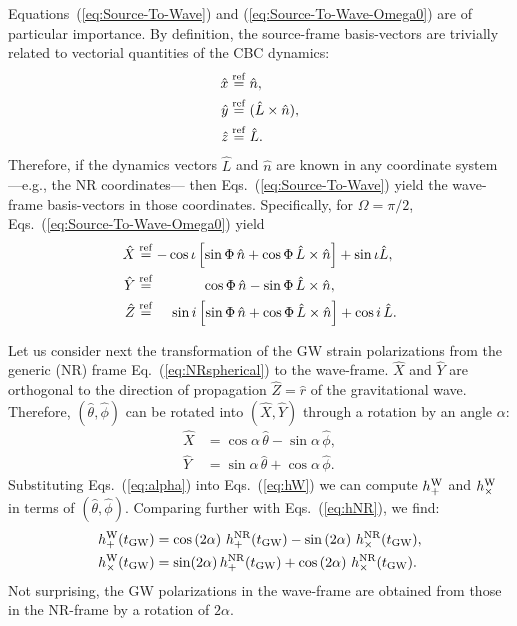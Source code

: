 \documentclass[aps,prd,amssymb,amsmath,amsfonts,superscriptaddress,
floatfix ,preprintnumbers,altaffilletter]{revtex4}
\newcommand{\ErNR}{{\hat r}}
\newcommand{\EtNR}{{\hat\theta}}
\newcommand{\EpNR}{{\hat\phi}}
\newcommand{\hpNR}{h_+^{\rm NR}}
\newcommand{\hcNR}{h_{\times}^{\rm NR}}
\newcommand{\nNR}{\hat{n}}
\newcommand{\lNR}{\hat L}
\newcommand{\tGW}{t_{\rm GW}}
\newcommand{\ExS}{{{\hat x}}}
\newcommand{\EyS}{{{\hat y}}}
\newcommand{\EzS}{{{\hat z}}}
\newcommand{\ExW}{\hat X}
\newcommand{\EyW}{\hat Y}
\newcommand{\EzW}{\hat Z}
\newcommand{\hpW}{h_+^{\rm W}}
\newcommand{\hcW}{h_\times^{\rm W}}
\newcommand{\phiRef}{\Phi} %
\newcommand{\equalref}{\overset{\rm ref}{=}}
\begin{document}
Equations~(\ref{eq:Source-To-Wave}) and
(\ref{eq:Source-To-Wave-Omega0}) are of particular importance.  By
definition, the source-frame basis-vectors are trivially related to
vectorial quantities of the CBC dynamics:
\begin{subequations}
  \begin{align}
    \ExS&\equalref \nNR,\\
    \EyS&\equalref (\lNR\times\nNR),\\
    \EzS&\equalref \lNR.
  \end{align}
\end{subequations}
Therefore, if the dynamics vectors $\lNR$ and $\nNR$ are known in any
coordinate system ---e.g., the NR coordinates--- then
Eqs.~(\ref{eq:Source-To-Wave}) yield the wave-frame basis-vectors in those
coordinates.  Specifically, for $\Omega=\pi/2$,
Eqs.~(\ref{eq:Source-To-Wave-Omega0}) yield
\begin{subequations}
  \begin{align}
    \ExW &\equalref-\cos\iota\left[\sin\phiRef\,\nNR +\cos\phiRef\,\lNR\times\nNR\right]+\sin\iota\lNR,\\
    \EyW &\equalref \qquad\quad\;\,\cos\phiRef\,\nNR -\sin\phiRef\,\lNR\times\nNR,\\
\label{eq:Z}
    \EzW&\equalref\;\;\;\; \sin i\left[\sin\phiRef\,\nNR +\cos\phiRef\,\lNR\times\nNR\right]
    +\cos i\,\lNR.
  \end{align}
\end{subequations}

Let us consider next the transformation of the GW strain polarizations
from the generic (NR) frame Eq.~(\ref{eq:NRspherical}) to the
wave-frame.  $\ExW$ and $\EyW$ are orthogonal to the direction of
propagation $\EzW=\ErNR$ of the gravitational wave.  Therefore,
$(\EtNR, \EpNR)$ can be rotated into $(\ExW, \EyW)$ through a rotation
by an angle $\alpha$:
\begin{subequations}\label{eq:alpha}
\begin{align}
\ExW & = \cos\alpha\,\EtNR - \sin\alpha\,\EpNR,\\
\label{eq:alphaY}
\EyW & = \sin\alpha\,\EtNR +\cos\alpha\,\EpNR.
\end{align}
\end{subequations}
Substituting Eqs.~(\ref{eq:alpha}) into Eqs.~(\ref{eq:hW}) we can compute $\hpW$ and $\hcW$ in terms of $(\EtNR,\EpNR)$.  Comparing further with Eqs.~(\ref{eq:hNR}), we find:
\begin{subequations}
\label{eq:PolarizationTrafo}
\begin{align}
  \hpW(\tGW) &= \cos\left(2\alpha\right)\,\hpNR(\tGW) -\sin\left(2\alpha\right)\,\hcNR(\tGW),\\
  \hcW(\tGW) &= \sin(2\alpha)\,\hpNR(\tGW)+\cos\left(2\alpha\right)\,\hcNR(\tGW).
\end{align}
\end{subequations}
Not surprising, the GW polarizations in the wave-frame are obtained
from those in the NR-frame by a rotation of $2\alpha$.
\end{document}
